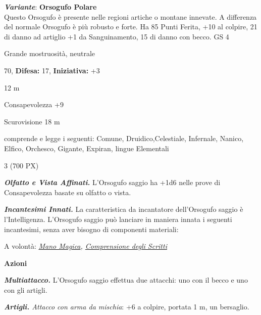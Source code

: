 \begin{multicols}{2}
{\emph{\textbf{Variante}}: \textbf{Orsogufo Polare}\\
Questo Orsogufo è presente nelle regioni artiche o montane innevate. A differenza del normale Orsogufo è più robusto e forte. Ha 85 Punti Ferita, +10 al colpire, 21 di danno ad artiglio +1 da Sanguinamento, 15 di danno con becco. GS 4

\noindent
\begin{description}[noitemsep, topsep=0pt, parsep=0pt, partopsep=0pt, leftmargin=0cm, labelwidth=2.2cm]
	\item[\textbf{Taglia/Tipo:}] Grande mostruosità, neutrale
	\item[\textbf{Caratt.:}] 
	\item[\textbf{Punti Ferita:}] 70,  \textbf{Difesa:} 17,  \textbf{Iniziativa:} +3
	\item[\textbf{Movimento:}] 12 m
	\item[\textbf{Tiri Salvez.:}] 
	\item[\textbf{Comp.:}] Consapevolezza +9
	\item[\textbf{Sensi:}] Scurovisione 18 m
	\item[\textbf{Linguaggi:}] comprende e legge i seguenti: Comune, Druidico,Celestiale, Infernale, Nanico, Elfico, Orchesco, Gigante, Expiran, lingue Elementali
	\item[\textbf{Sfida:}] 3 (700 PX)\smallskip
\end{description}

\emph{\textbf{Olfatto e Vista Affinati.}} L'Orsogufo saggio ha +1d6 nelle prove di Consapevolezza basate su olfatto o vista.

\emph{\textbf{Incantesimi Innati.}} La caratteristica da incantatore dell'Orsogufo saggio è l'Intelligenza. L'Orsogufo saggio può lanciare in maniera innata i seguenti incantesimi, senza aver bisogno di componenti materiali:

A volontà: \emph{\hyperlink{Mano Magica}{Mano Magica}, \hyperlink{Comprensione degli Scritti}{Comprensione degli Scritti}}

\textbf{Azioni}

\emph{\textbf{Multiattacco.}} L'Orsogufo saggio effettua due attacchi: uno con il becco e uno con gli artigli.

\emph{\textbf{Artigli.} Attacco con arma da mischia}: +6 a colpire, portata 1 m, un bersaglio.

}
\end{multicols}

